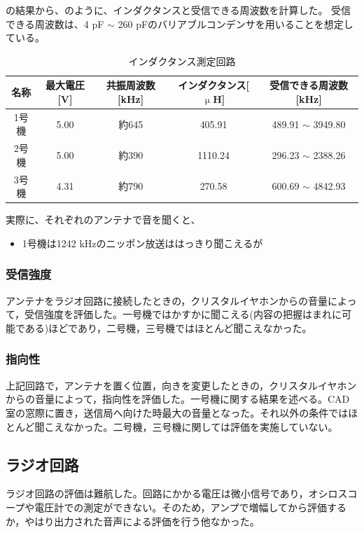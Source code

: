 \documentclass[report.tex]{subfiles}
\begin{document}
の結果から、のように、インダクタンスと受信できる周波数を計算した。
受信できる周波数は、4 pF \(\sim\) 260 pFのバリアブルコンデンサを用いることを想定している。

\begin{table}[h]
	\centering
	\caption{インダクタンス測定回路}
	\label{tab:ant2}
	\begin{tabular}{ccccc} \hline
		名称  & 最大電圧[V] & 共振周波数[kHz] & インダクタンス[\(\upmu\)H] & 受信できる周波数[kHz]           \\ \hline
		1号機 & 5.00    & 約645       & 405.91              & 489.91 \(\sim\) 3949.80 \\
		2号機 & 5.00    & 約390       & 1110.24             & 296.23 \(\sim\) 2388.26 \\
		3号機 & 4.31    & 約790       & 270.58              & 600.69 \(\sim\) 4842.93 \\ \hline
	\end{tabular}
\end{table}

実際に、それぞれのアンテナで音を聞くと、

\begin{itemize}
	\item 1号機は1242 kHzのニッポン放送ははっきり聞こえるが
\end{itemize}

\subsubsection{受信強度}
アンテナをラジオ回路に接続したときの，クリスタルイヤホンからの音量によって，受信強度を評価した。一号機ではかすかに聞こえる(内容の把握はまれに可能である)ほどであり，二号機，三号機ではほとんど聞こえなかった。
\subsubsection{指向性}
上記回路で，アンテナを置く位置，向きを変更したときの，クリスタルイヤホンからの音量によって，指向性を評価した。一号機に関する結果を述べる。CAD室の窓際に置き，送信局へ向けた時最大の音量となった。それ以外の条件ではほとんど聞こえなかった。二号機，三号機に関しては評価を実施していない。

\subsection{ラジオ回路}
ラジオ回路の評価は難航した。回路にかかる電圧は微小信号であり，オシロスコープや電圧計での測定ができない。そのため，アンプで増幅してから評価するか，やはり出力された音声による評価を行う他なかった。
\end{document}
